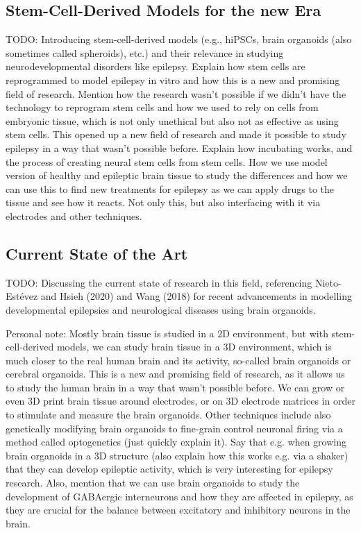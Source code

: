 \documentclass[10pt]{article}
\begin{document}
\begin{sloppypar}
  \subsection{Stem-Cell-Derived Models for the new Era}
  \label{sec:stem-cell-derived-models-for-the-new-era}

  TODO: Introducing stem-cell-derived models (e.g., hiPSCs, brain organoids (also sometimes called spheroids), etc.) and their relevance in studying neurodevelopmental disorders like epilepsy. Explain how stem cells are reprogrammed to model epilepsy in vitro and how this is a new and promising field of research. Mention how the research wasn't possible if we didn't have the technology to reprogram stem cells and how we used to rely on cells from embryonic tissue, which is not only unethical but also not as effective as using stem cells. This opened up a new field of research and made it possible to study epilepsy in a way that wasn't possible before. Explain how incubating works, and the process of creating neural stem cells from stem cells. How we use model version of healthy and epileptic brain tissue to study the differences and how we can use this to find new treatments for epilepsy as we can apply drugs to the tissue and see how it reacts. Not only this, but also interfacing with it via electrodes and other techniques.

  \subsection{Current State of the Art}
  \label{sec:current-state-of-the-art}

  TODO: Discussing the current state of research in this field, referencing Nieto-Estévez and Hsieh (2020) and Wang (2018) for recent advancements in modelling developmental epilepsies and neurological diseases using brain organoids.

  Personal note: Mostly brain tissue is studied in a 2D environment, but with stem-cell-derived models, we can study brain tissue in a 3D environment, which is much closer to the real human brain and its activity, so-called brain organoids or cerebral organoids. This is a new and promising field of research, as it allows us to study the human brain in a way that wasn't possible before. We can grow or even 3D print brain tissue around electrodes, or on 3D electrode matrices in order to stimulate and measure the brain organoids. Other techniques include also genetically modifying brain organoids to fine-grain control neuronal firing via a method called optogenetics (just quickly explain it). Say that e.g. when growing brain organoids in a 3D structure (also explain how this works e.g. via a shaker) that they can develop epileptic activity, which is very interesting for epilepsy research. Also, mention that we can use brain organoids to study the development of GABAergic interneurons and how they are affected in epilepsy, as they are crucial for the balance between excitatory and inhibitory neurons in the brain.


\end{sloppypar}
\end{document}
